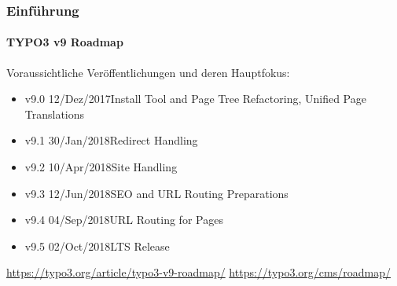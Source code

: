 
\begin{frame}[fragile]
	\frametitle{Einführung}
	\framesubtitle{TYPO3 v9 Roadmap}

	Voraussichtliche Veröffentlichungen und deren Hauptfokus:

	\begin{itemize}

		\item v9.0 \tabto{1.1cm}12/Dez/2017\tabto{3.4cm}Install Tool and Page Tree Refactoring,\newline
			\tabto{3.4cm}Unified Page Translations
		\item v9.1 \tabto{1.1cm}30/Jan/2018\tabto{3.4cm}Redirect Handling
		\item v9.2 \tabto{1.1cm}10/Apr/2018\tabto{3.4cm}Site Handling
        \item v9.3 \tabto{1.1cm}12/Jun/2018\tabto{3.4cm}SEO and URL Routing Preparations
		\item
			\begingroup
				\color{typo3orange}
                    v9.4 \tabto{1.1cm}04/Sep/2018\tabto{3.4cm}URL Routing for Pages
			\endgroup
		\item v9.5 \tabto{1.1cm}02/Oct/2018\tabto{3.4cm}LTS Release

	\end{itemize}

	\smaller
		\url{https://typo3.org/article/typo3-v9-roadmap/}\newline
		\url{https://typo3.org/cms/roadmap/}
	\normalsize

\end{frame}


